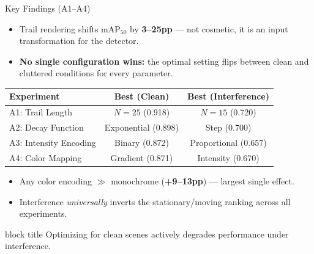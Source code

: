 \documentclass[aspectratio=169, 10pt]{beamer}
\newcommand{\maptf}{\text{mAP}_{50}}
\newcommand{\emphnum}[1]{\textcolor{Garnet}{\textbf{#1}}}
\newcommand{\keypoint}[1]{%
  \vfill
  \begin{beamercolorbox}[wd=\textwidth, dp=0.4em, leftskip=0.3cm]{block title}%
    \small #1%
  \end{beamercolorbox}%
}
\begin{document}
\begin{frame}{Key Findings (A1--A4)}

\begin{itemize}\setlength{\itemsep}{4pt}
  \item Trail rendering shifts $\maptf$ by \emphnum{3--25pp} --- not cosmetic,
        it is an input transformation for the detector.

  \item \textbf{No single configuration wins:} the optimal setting flips between
        clean and cluttered conditions for every parameter.

\end{itemize}

\vspace{0.15cm}

\begin{center}
\small
\begin{tabular}{@{}l c c@{}}
  \toprule
  \textbf{Experiment} & \textbf{Best (Clean)} & \textbf{Best (Interference)} \\
  \midrule
  A1: Trail Length      & $N{=}25$ (0.918) & $N{=}15$ (0.720) \\
  A2: Decay Function    & Exponential (0.898) & Step (0.700) \\
  A3: Intensity Encoding & Binary (0.872) & Proportional (0.657) \\
  A4: Color Mapping     & Gradient (0.871) & Intensity (0.670) \\
  \bottomrule
\end{tabular}
\end{center}

\vspace{0.15cm}

\begin{itemize}\setlength{\itemsep}{4pt}
  \item Any color encoding $\gg$ monochrome (\emphnum{+9--13pp}) --- largest single effect.
  \item Interference \textit{universally} inverts the stationary/moving ranking across all experiments.
\end{itemize}

\keypoint{Optimizing for clean scenes actively degrades performance under interference.}
\end{frame}
\end{document}
